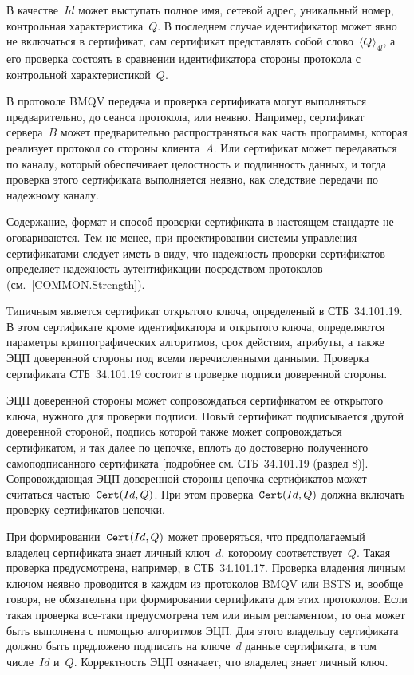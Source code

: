 \begin{note}
В качестве~$Id$ может выступать полное имя, сетевой адрес, уникальный номер,
контрольная характеристика~$Q$.
%
В последнем случае идентификатор может явно не включаться в сертификат, сам
сертификат представлять собой слово~$\langle Q\rangle_{4l}$, а его проверка
состоять в сравнении идентификатора стороны протокола с контрольной
характеристикой~$Q$.
\end{note}

В протоколе BMQV передача и проверка сертификата могут выполняться
предварительно, до сеанса протокола, или неявно.
%
Например, сертификат сервера~$B$ может предварительно распространяться как часть
программы, которая реализует протокол со стороны клиента~$A$.
%
Или сертификат может передаваться по каналу, который обеспечивает целостность и
подлинность данных, и тогда проверка этого сертификата выполняется неявно, как
следствие передачи по надежному каналу.

Содержание, формат и способ проверки сертификата в настоящем стандарте не
оговариваются.
%
Тем не менее, при проектировании системы управления сертификатами следует иметь
в виду, что надежность проверки сертификатов определяет надежность
аутентификации посредством протоколов (см.~\ref{COMMON.Strength}).

Типичным является сертификат открытого ключа, определеный в СТБ~34.101.19. В
этом сертификате кроме идентификатора и открытого ключа, определяются параметры
криптографических алгоритмов, срок действия, атрибуты, а также ЭЦП доверенной
стороны под всеми перечисленными данными.
%
Проверка сертификата СТБ~34.101.19 состоит в проверке подписи доверенной
стороны.

\begin{note}
ЭЦП доверенной стороны может сопровождаться 
сертификатом ее открытого ключа, нужного для проверки 
подписи. Новый сертификат подписывается другой
доверенной стороной, подпись которой также может сопровождаться 
сертификатом, и так далее по цепочке, вплоть до достоверно 
полученного самоподписанного сертификата 
[подробнее см. СТБ~34.101.19 (раздел 8)].
%
Сопровождающая ЭЦП доверенной стороны цепочка сертификатов 
может считаться частью~$\texttt{Cert}(Id,Q)$.
При этом проверка~$\texttt{Cert}(Id,Q)$ должна вклю\-чать проверку 
сертификатов цепочки.
\end{note}

При формировании~$\texttt{Cert}(Id,Q)$ может проверяться, что предполагаемый владелец
сертификата знает личный ключ~$d$, которому соответствует~$Q$. Такая проверка
предусмотрена, например, в СТБ~34.101.17.
%
Проверка владения личным ключом неявно проводится в каждом из протоколов BMQV
или BSTS и, вообще говоря, не обязательна при формировании сертификата для этих
протоколов.
%
Если такая проверка все-таки предусмотрена тем или иным регламентом, то она
может быть выполнена с помощью алгоритмов ЭЦП. Для этого владельцу сертификата
должно быть предложено подписать на ключе~$d$ данные сертификата, в том
числе~$Id$ и~$Q$.
%
Корректность ЭЦП означает, что владелец знает личный ключ.

